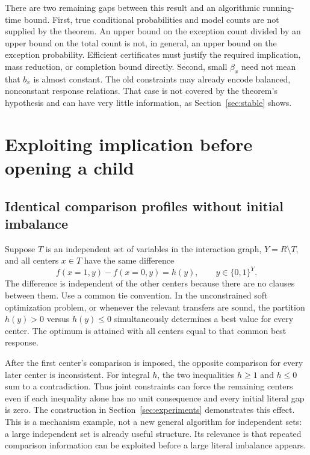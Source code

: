 \documentclass[11pt,a4paper]{article}
\theoremstyle{definition}
\theoremstyle{remark}
\begin{document}
There are two remaining gaps between this result and an algorithmic
running-time bound. First, true conditional probabilities and model counts
are not supplied by the theorem. An upper bound on the exception count
divided by an upper bound on the total count is not, in general, an upper
bound on the exception probability. Efficient certificates must justify
the required implication, mass reduction, or completion bound directly.
Second, small $\beta_x$ need not mean that $b_x$ is almost constant.
The old constraints may already encode balanced, nonconstant response
relations. That case is not covered by the theorem's hypothesis and can
have very little information, as Section~\ref{sec:stable} shows.

\section{Exploiting implication before opening a child}
\label{sec:joint}

\subsection{Identical comparison profiles without initial imbalance}

Suppose $T$ is an independent set of variables in the interaction graph,
$Y=R\setminus T$, and all centers $x\in T$ have the same difference
\[
 f(x=1,y)-f(x=0,y)=h(y),\qquad y\in\{0,1\}^Y.
\]
The difference is independent of the other centers because there are no
clauses between them. Use a common tie convention. In the unconstrained
soft optimization problem, or whenever the relevant transfers are sound,
the partition $h(y)>0$ versus $h(y)\le0$ simultaneously determines a
best value for every center. The optimum is attained with all centers
equal to that common best response.

After the first center's comparison is imposed, the opposite comparison
for every later center is inconsistent. For integral $h$, the two
inequalities $h\ge1$ and $h\le0$ sum to a contradiction. Thus joint
constraints can force the remaining centers even if each inequality
alone has no unit consequence and every initial literal gap is zero.
The construction in Section~\ref{sec:experiments} demonstrates this effect.
This is a mechanism example, not a new general algorithm for independent
sets: a large independent set is already useful structure. Its relevance
is that repeated comparison information can be exploited before a large
literal imbalance appears.
\end{document}
